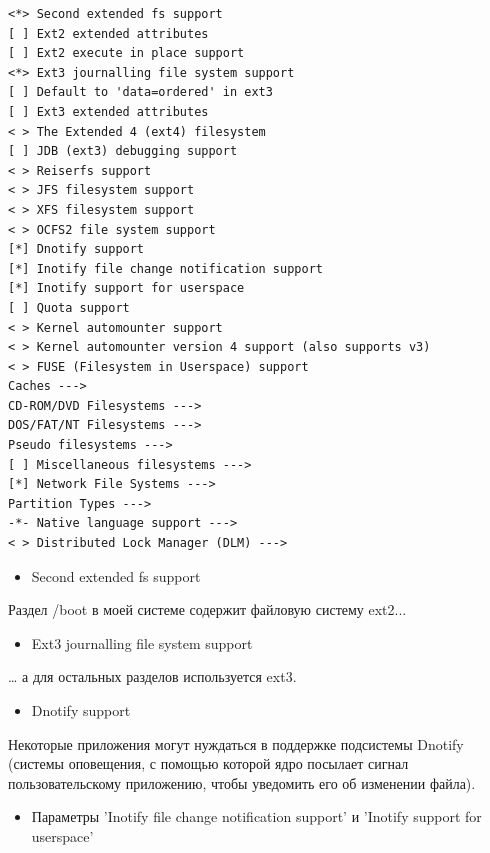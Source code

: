 \documentclass[10pt]{book}
\begin{document}
\vspace{3mm}
\begin{tcolorbox}[colback=gray!14!white, colframe=blue!75!blue]
\begin{lstlisting}
<*> Second extended fs support
[ ] Ext2 extended attributes
[ ] Ext2 execute in place support
<*> Ext3 journalling file system support
[ ] Default to 'data=ordered' in ext3
[ ] Ext3 extended attributes
< > The Extended 4 (ext4) filesystem
[ ] JDB (ext3) debugging support
< > Reiserfs support
< > JFS filesystem support
< > XFS filesystem support
< > OCFS2 file system support
[*] Dnotify support
[*] Inotify file change notification support
[*] Inotify support for userspace
[ ] Quota support
< > Kernel automounter support
< > Kernel automounter version 4 support (also supports v3)
< > FUSE (Filesystem in Userspace) support
Caches --->
CD-ROM/DVD Filesystems --->
DOS/FAT/NT Filesystems --->
Pseudo filesystems --->
[ ] Miscellaneous filesystems --->
[*] Network File Systems --->
Partition Types --->
-*- Native language support --->
< > Distributed Lock Manager (DLM) --->
\end{lstlisting}
\end{tcolorbox}

\begin{itemize}
\item Second extended fs support
\end{itemize}

Раздел /boot в моей системе содержит файловую систему ext2...

\begin{itemize}
\item Ext3 journalling file system support
\end{itemize}

… а для остальных разделов используется ext3.

\begin{itemize}
\item Dnotify support
\end{itemize}

Некоторые приложения могут нуждаться в поддержке подсистемы Dnotify (системы оповещения, с помощью которой ядро посылает сигнал пользовательскому приложению, чтобы уведомить его об изменении файла).

\begin{itemize}
\item Параметры 'Inotify file change notification support' и 'Inotify support for userspace'
\end{itemize}
\end{document}
